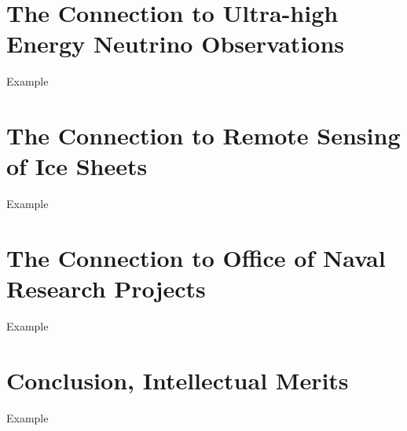 \documentclass[../../main.tex]{subfiles}
\begin{document}
%

\section{The Connection to Ultra-high Energy Neutrino Observations}
\label{sec:askaryan}

Example

\section{The Connection to Remote Sensing of Ice Sheets}
\label{sec:cresis}

Example

\section{The Connection to Office of Naval Research Projects}
\label{sec:onr}

Example

\section{Conclusion, Intellectual Merits}
\label{sec:conc_im}

Example
\end{document}
